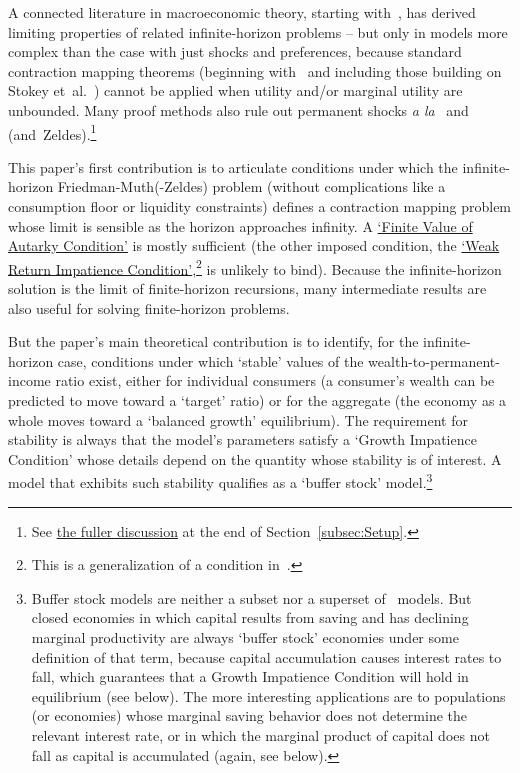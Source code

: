 \documentclass[BufferStockTheory]{subfiles}
\begin{document}
A connected literature in macroeconomic theory, starting with~\cite{bewleyPIH}, has derived limiting properties of related infinite-horizon problems -- but only in models more complex than the case with just shocks and preferences, because standard contraction mapping theorems (beginning with~\cite{bellmanDynamicProgramming} and including those building on Stokey et~al.~\citeyearpar{slpMethods}) cannot be applied when utility and/or marginal utility are unbounded. Many proof methods also rule out permanent shocks \textit{a la}~\cite{friedmanATheory} and~\cite{muthOptimal} (and~Zeldes).\footnote{See \hyperlink{DiffFromLit}{the fuller discussion} at the end of Section~\ref{subsec:Setup}.}

This paper's first contribution is to articulate conditions under which the infinite-horizon Friedman-Muth(-Zeldes) problem (without complications like a consumption floor or liquidity constraints) defines a contraction mapping problem whose limit is sensible as the horizon approaches infinity.  A \hyperlink{FVAC}{`Finite Value of Autarky Condition'} is mostly sufficient (the other imposed condition, the \hyperlink{WRIC}{`Weak Return Impatience Condition'},\footnote{This is a generalization of a condition in~\cite{mstIncFluct}.} is unlikely to bind).  Because the infinite-horizon solution is the limit of finite-horizon recursions, many intermediate results are also useful for solving finite-horizon problems.

But the paper's main theoretical contribution is to identify, for the infinite-horizon case, conditions under which `stable' values of the wealth-to-permanent-income ratio exist, either for individual consumers (a consumer's wealth can be predicted to move toward a `target' ratio) or for the aggregate (the economy as a whole moves toward a `balanced growth' equilibrium).  The requirement for stability is always that the model's parameters satisfy a `Growth Impatience Condition' whose details depend on the quantity whose stability is of interest.  A model that exhibits such stability qualifies as a `buffer stock' model.\footnote{Buffer stock models are neither a subset nor a superset of~\cite{bewleyPIH} models.  But closed economies in which capital results from saving and has declining marginal productivity are always `buffer stock' economies under some definition of that term, because capital accumulation causes interest rates to fall, which guarantees that a Growth Impatience Condition will hold in equilibrium (see below).  The more interesting applications are to populations (or economies) whose marginal saving behavior does not determine the relevant interest rate, or in which the marginal product of capital does not fall as capital is accumulated (again, see below).}
\end{document}
